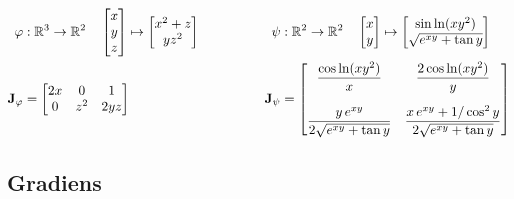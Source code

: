 \documentclass{szb-solution}
\begin{document}
\begin{alignat*}{9}
  \varphi         & : \mathbb{R}^3 \to \mathbb{R}^2
  \quad
  \begin{bmatrix}
    x \\ y \\ z
  \end{bmatrix}
  \mapsto
  \begin{bmatrix}
    x^2 + z \\ y z^2
  \end{bmatrix}
  \qquad\qquad
                  &
  \psi            & : \mathbb{R}^2 \to \mathbb{R}^2
  \quad
  \begin{bmatrix}
    x \\ y
  \end{bmatrix}
  \mapsto
  \begin{bmatrix}
    \sin \ln (x y^2) \\ \sqrt{e^{xy} + \tan y}
  \end{bmatrix}
  \\
  \mathbf{J}_\varphi & = \begin{bmatrix}
                        2x & 0   & 1   \\
                        0  & z^2 & 2yz
                      \end{bmatrix}
                  &
  \mathbf{J}_\psi    & = \begin{bmatrix}
                        \dfrac{\cos \ln (x y^2)}{x}              &
                        \dfrac{2 \cos \ln (x y^2)}{y}              \\[5mm]
                        \dfrac{y\,e^{xy}}{2\sqrt{e^{xy}+\tan y}} &
                        \dfrac{x\,e^{xy}+1 / \cos^2 y}{2\sqrt{e^{xy}+\tan y}}
                      \end{bmatrix}
\end{alignat*}

\subsection{Gradiens}
\end{document}
